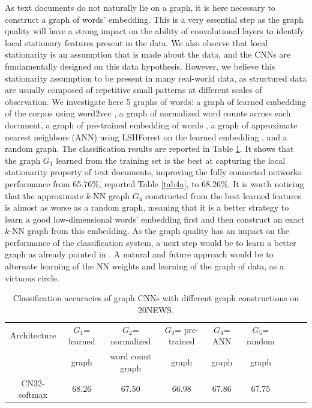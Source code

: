 \documentclass{article}
\begin{document}
\noindent
As text documents do not naturally lie on a graph, it is here necessary to construct a graph of words' embedding. This is a very essential step as the graph quality will have a strong impact on the ability of convolutional layers to identify local stationary features present in the data. We also observe that local stationarity is an assumption that is made about the data, and the CNNs are fundamentally designed on this data hypothesis. However, we believe this stationarity assumption to be present in many real-world data, as structured data are usually composed of repetitive small patterns at different scales of observation. We investigate here 5 graphs of words: a graph of learned embedding of the corpus using word2vec \cite{pro:MikolovChenCorradoDean13word2vec}, a graph of normalized word counts across each document,
a graph of pre-trained embedding of words \cite{pro:MikolovChenCorradoDean13word2vec}, a graph of approximate nearest neighbors (ANN) using LSHForest on the learned embedding \cite{pro:MikolovChenCorradoDean13word2vec}, and a random graph. The classification results are reported in Table \ref{tab4b}. It shows that the graph $G_1$ learned from the training set is the best at capturing the local stationarity property of text documents, improving the fully connected networks performance from 65.76\%, reported Table \ref{tab4a}, to 68.26\%. It is worth noticing that the approximate $k$-NN graph $G_4$ constructed from the best learned features is almost as worse as a random graph, meaning that it is a better strategy to learn a good low-dimensional words' embedding first and then construct an exact $k$-NN graph from this embedding. As the graph quality has an impact on the performance of the classification system, a next step would be to learn a better graph as already pointed in \cite{art:HenaffBrunaLeCun15DLgraphs}. A natural and future approach would be to alternate learning of the NN weights and learning of the graph of data, as a virtuous circle. 




\begin{table}[h!]
 \centering
{\small
\begin{tabular}{|c|c|c|c|c|c|c|c|c|}
\hline
 Architecture & $G_1$= learned  & $G_2$= normalized  & $G_3$= pre-trained & $G_4$= ANN  &  $G_5$= random   \\
  & graph \cite{pro:MikolovChenCorradoDean13word2vec} & word count graph & graph  &  graph  & graph \\
\hline
CN32-softmax & 68.26 & 67.50 & 66.98 & 67.86 & 67.75  \\
\hline
\end{tabular}
}
\caption{Classification accuracies of graph CNNs with different graph constructions on 20NEWS.} 
\label{tab4b}
\end{table}
\end{document}
